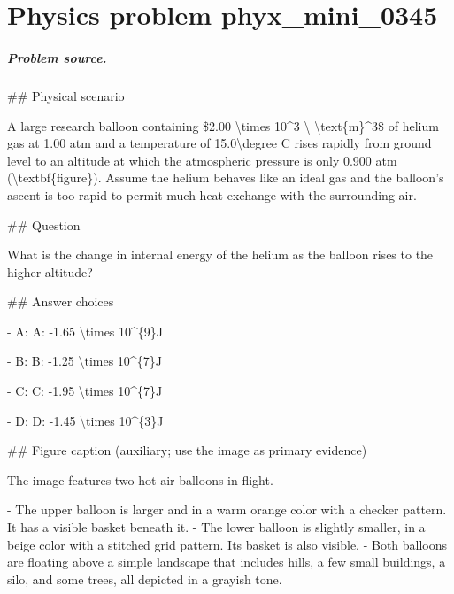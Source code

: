 
\chapter{Physics problem phyx\_mini\_0345}
\label{ch:PhyXMiniProblems_problem_phyx_mini_0345}

\paragraph{Problem source.}
\#\# Physical scenario

A large research balloon containing \$2.00 \textbackslash{}times 10\textasciicircum{}3 \textbackslash{} \textbackslash{}text\{m\}\textasciicircum{}3\$ of helium gas at 1.00 atm and a temperature of 15.0\textbackslash{}degree C rises rapidly from ground level to an altitude at which the atmospheric pressure is only 0.900 atm (\textbackslash{}textbf\{figure\}). Assume the helium behaves like an ideal gas and the balloon’s ascent is too rapid to permit much heat exchange with the surrounding air.

\#\# Question

What is the change in internal energy of the helium as the balloon rises to the higher altitude?

\#\# Answer choices

- A: A: -1.65 \textbackslash{}times 10\textasciicircum{}\{9\}J

- B: B: -1.25 \textbackslash{}times 10\textasciicircum{}\{7\}J

- C: C: -1.95 \textbackslash{}times 10\textasciicircum{}\{7\}J

- D: D: -1.45 \textbackslash{}times 10\textasciicircum{}\{3\}J

\#\# Figure caption (auxiliary; use the image as primary evidence)

The image features two hot air balloons in flight. 

- The upper balloon is larger and in a warm orange color with a checker pattern. It has a visible basket beneath it.
- The lower balloon is slightly smaller, in a beige color with a stitched grid pattern. Its basket is also visible.
- Both balloons are floating above a simple landscape that includes hills, a few small buildings, a silo, and some trees, all depicted in a grayish tone. 

